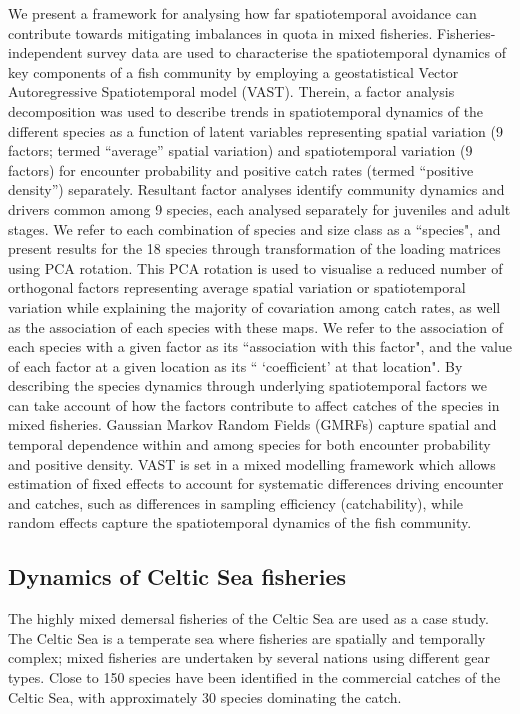 \documentclass[fleqn,10pt]{wlscirep}
\begin{document}
\begin{linenumbers}
We present a framework for analysing how far spatiotemporal avoidance can
contribute towards mitigating imbalances in quota in mixed fisheries.
Fisheries-independent survey data are used to characterise the spatiotemporal
dynamics of key components of a fish community by employing a geostatistical
Vector Autoregressive Spatiotemporal model (VAST).  Therein, a factor analysis
decomposition was used to describe trends in spatiotemporal dynamics of the
different species as a function of latent variables\cite{Thorson2015}
representing spatial variation (9 factors; termed ``average'' spatial
variation) and spatiotemporal variation (9 factors) for encounter probability
and positive catch rates (termed ``positive density'')
separately\cite{Thorson2015a}.  Resultant factor analyses identify community
dynamics and drivers common among 9 species, each analysed separately for
juveniles and adult stages.  We refer to each combination of species and size
class as a ``species", and present results for the 18 species through
transformation of the loading matrices using PCA rotation. This PCA
rotation is used to visualise a reduced number of orthogonal factors representing
average spatial variation or spatiotemporal variation while explaining the
majority of covariation among catch rates, as well as the association of each
species with these maps. We refer to the association of each species with a
given factor as its ``association with this factor", and the value of each
factor at a given location as its `` `coefficient' at that location". By
describing the species dynamics through underlying  spatiotemporal factors we
can take account of how the factors contribute to affect catches of the species
in mixed fisheries. Gaussian Markov Random Fields (GMRFs) capture spatial and
temporal dependence within and among species for both encounter probability and
positive density\cite{Thorson2013}.  VAST is set in a mixed modelling framework
which allows estimation of fixed effects to account for systematic differences
driving encounter and catches, such as differences in sampling efficiency
(catchability), while random effects capture the spatiotemporal dynamics of the
fish community.\\

\subsection*{Dynamics of Celtic Sea fisheries\\}

The highly mixed demersal fisheries of the Celtic Sea are used as a case study.
The Celtic Sea is a temperate sea where fisheries are spatially and temporally
complex; mixed fisheries are undertaken by several nations using different gear
types\cite{Ellis2000, Gerritsen2012}. Close to 150 species have been identified
in the commercial catches of the Celtic Sea, with approximately 30 species
dominating the catch\cite{Mateo2016}.\\


\end{linenumbers}
\end{document}
